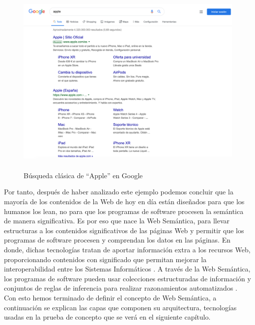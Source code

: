 \begin{figure}[H]
	\centering
	\includegraphics[height=9.4cm]{imagenes/capitulo3/apple}
	\caption{Búsqueda clásica de ``Apple'' en Google}
	\label{busqueda-sintactica}
\end{figure}


Por tanto, después de haber analizado este ejemplo podemos concluir que la mayoría de los contenidos de la Web de hoy en día están diseñados para que los humanos los lean, no para que los programas de software procesen la semántica de manera significativa. Es por eso que nace la Web Semántica, para llevar estructuras a los contenidos significativos de las páginas Web y permitir que los programas de software procesen y comprendan los datos en las páginas. En donde, dichas tecnologías tratan de aportar información extra a los recursos Web, proporcionando contenidos con significado que permitan mejorar la interoperabilidad entre los Sistemas Informáticos \cite{aplicacion}. A través de la Web Semántica, los programas de software pueden usar colecciones estructuradas de información y conjuntos de reglas de inferencia para realizar razonamientos automatizados \cite{libro-gis}. \\

Con esto hemos terminado de definir el concepto de Web Semántica, a continuación se explican las capas que componen su arquitectura, tecnologías usadas en la prueba de concepto que se verá en el siguiente capítulo.


